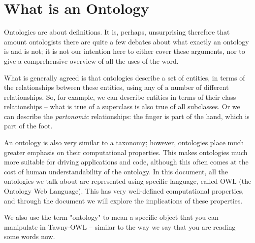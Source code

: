 \section{What is an Ontology}
\label{what_is_an_ontology}

Ontologies are about definitions. It is, perhaps, unsurprising therefore
that amount ontologists there are quite a few debates about what exactly
an ontology is and is not; it is not our intention here to either cover
these arguments, nor to give a comprehensive overview of all the uses of
the word.

What is generally agreed is that ontologies describe a set of entities,
in terms of the relationships between these entities, using any of a
number of different relationships. So, for example, we can describe
entities in terms of their class relationships -- what is true of a
superclass is also true of all subclasses. Or we can describe the
\emph{partonomic} relationships: the finger is part of the hand, which is
part of the foot.

An ontology is also very similar to a taxonomy; however, ontologies
place much greater emphasis on their computational properties. This
makes ontologies much more suitable for driving applications and code,
although this often comes at the cost of human understandability of the
ontology. In this document, all the ontologies we talk about are
represented using specific language, called OWL (the Ontology Web
Language). This has very well-defined computational properties, and
through the document we will explore the implications of these
properties.

We also use the term "ontology" to mean a specific object that you can
manipulate in Tawny-OWL -- similar to the way we say that you are
reading some words now.

